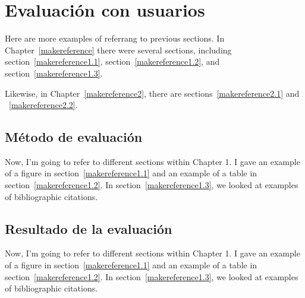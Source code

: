 
\cleardoublepage


\chapter{Evaluación con usuarios}
\label{makereference5}

Here are more examples of referrang to previous sections.  In
Chapter~\ref{makereference} there were several sections, including
section~\ref{makereference1.1}, section~\ref{makereference1.2},
and section~\ref{makereference1.3}.

Likewise, in Chapter~\ref{makereference2}, there are
sections~\ref{makereference2.1} and ~\ref{makereference2.2}.

\section{Método de evaluación}
\label{makereference5.1} Now, I'm going to refer to different
sections within Chapter 1. I gave an example of a figure in
section~\ref{makereference1.1} and an example of a table in
section~\ref{makereference1.2}.  In
section~\ref{makereference1.3}, we looked at examples of
bibliographic citations.

\section{Resultado de la evaluación}
\label{makereference5.2} Now, I'm going to refer to different
sections within Chapter 1. I gave an example of a figure in
section~\ref{makereference1.1} and an example of a table in
section~\ref{makereference1.2}.  In
section~\ref{makereference1.3}, we looked at examples of
bibliographic citations.
